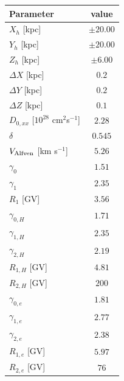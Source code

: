 \documentclass[doublespace,draft,nopageskip]{VTthesis} %
\begin{document}
\begin{table}
\centering
\begin{tabular}{lc}\hline\hline
Parameter                                              & value\\\hline
$X_h$ [kpc]                                            & $\pm 20.00$\\
$Y_h$ [kpc]                                            & $\pm 20.00$\\
$Z_h$ [kpc]                                            & $\pm 6.00$\\
$\Delta X$ [kpc]                                       & $0.2$\\
$\Delta Y$ [kpc]                                       & $0.2$\\
$\Delta Z$ [kpc]                                       & $0.1$\\
$D_{0,xx}$ [$10^{28}$ cm$^2$s$^{-1}$]                  & $2.28$\\
$\delta$                              & $0.545$\\
$V_{\rm Alfven}$ [km s$^{-1}$]                         & $5.26$ \\
$\gamma_0$                            & $1.51$ \\
$\gamma_1$                            & $2.35$\\
$R_1$ [GV]                            & $3.56$\\
$\gamma_{0,H}$                        & $1.71$\\
$\gamma_{1,H}$                        & $2.35$\\
$\gamma_{2,H}$                        & $2.19$\\
$R_{1,H}$ [GV]                        & $4.81$\\
$R_{2,H}$ [GV]                        & $200$\\
$\gamma_{0,e}$                        & $1.81$\\
$\gamma_{1,e}$                        & $2.77$\\
$\gamma_{2,e}$                        & $2.38$\\
$R_{1,e}$ [GV]                        & $5.97$\\
$R_{2,e}$ [GV]                        & $76$\\\hline\hline

\end{tabular}
\end{table}
\end{document}
